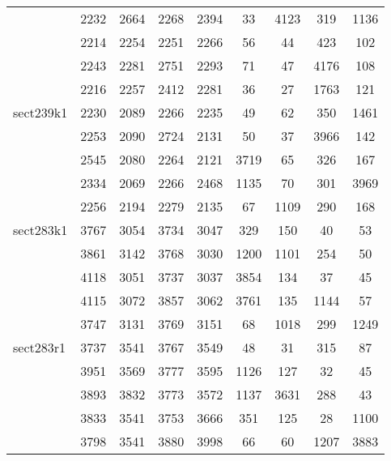 \documentclass[a4paper, 8pt, envcountsect, runningheads]{article}
\begin{document}
\begin{center}
\begin{longtable}{ |l|c|c|c|c|c|c|c|c| }
	 & 2232 & 2664 & 2268 & 2394 & 33 & 4123 & 319 & 1136 \\
	 	 
	 & 2214 & 2254 & 2251 & 2266 & 56 & 44 & 423 & 102 \\
	 
	 & 2243 & 2281 & 2751 & 2293 & 71 & 47 & 4176 & 108 \\
	 
	 & 2216 & 2257 & 2412 & 2281 & 36 & 27 & 1763 & 121 \\ \hline
	 
	 sect239k1 & 2230 & 2089 & 2266 & 2235 & 49 & 62 & 350 & 1461 \\
	 
	 & 2253 & 2090 & 2724 & 2131 & 50 & 37 & 3966 & 142 \\
	 	 
	 & 2545 & 2080 & 2264 & 2121 & 3719 & 65 & 326 & 167 \\
	 
	 & 2334 & 2069 & 2266 & 2468 & 1135 & 70 & 301 & 3969 \\
	 
	 & 2256 & 2194 & 2279 & 2135 & 67 & 1109 & 290 & 168 \\ \hline
	 
	 sect283k1 & 3767 & 3054 & 3734 & 3047 & 329 & 150 & 40 & 53 \\
	 
	 & 3861 & 3142 & 3768 & 3030 & 1200 & 1101 & 254 & 50 \\
	 	 
	 & 4118 & 3051 & 3737 & 3037 & 3854 & 134 & 37 & 45 \\
	 
	 & 4115 & 3072 & 3857 & 3062 & 3761 & 135 & 1144 & 57 \\
	 
	 & 3747 & 3131 & 3769 & 3151 & 68 & 1018 & 299 & 1249 \\ \hline
	 
	 sect283r1 & 3737 & 3541 & 3767 & 3549 & 48 & 31 & 315 & 87 \\
	 
	 & 3951 & 3569 & 3777 & 3595 & 1126 & 127 & 32 & 45 \\
	 	 
	 & 3893 & 3832 & 3773 & 3572 & 1137 & 3631 & 288 & 43 \\
	 
	 & 3833 & 3541 & 3753 & 3666 & 351 & 125 & 28 & 1100 \\
	 
	 & 3798 & 3541 & 3880 & 3998 & 66 & 60 & 1207 & 3883 \\ \hline	
	  

\end{longtable}
\end{center}
\end{document}
